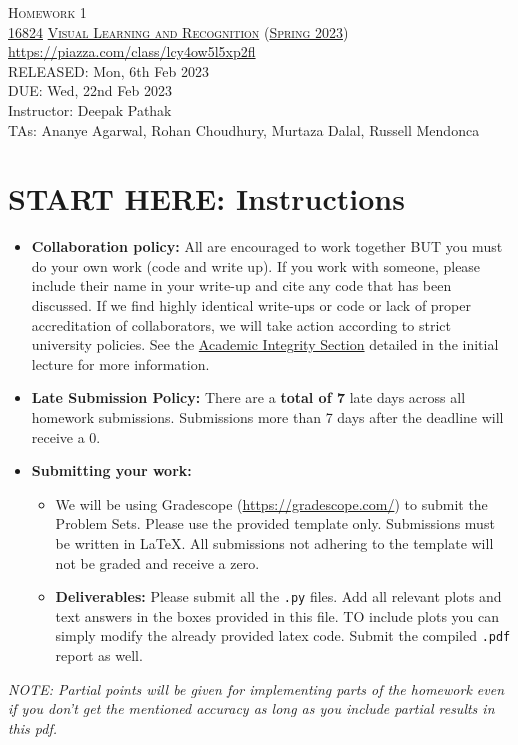 \documentclass[11pt,addpoints,answers]{exam}
\title{\textsc{\hwName}} %
\author{}
\date{}
\date{}
\numberwithin{equation}{section} %
\numberwithin{figure}{section} %
\numberwithin{table}{section} %
\newcommand{\courseNum}{\href{https://visual-learning.cs.cmu.edu/}{16824}}
\newcommand{\courseName}{\href{https://visual-learning.cs.cmu.edu/}{Visual Learning and Recognition}}
\newcommand{\courseSem}{\href{https://visual-learning.cs.cmu.edu/}{Spring 2023}}
\newcommand{\courseUrl}{\url{https://piazza.com/class/lcy4ow5l5xp2fl}}
\newcommand{\hwNum}{Homework 1}
\newcommand{\hwTopic}{Image Classification and Object Detection}
\newcommand{\outDate}{Mon, 6th Feb 2023}
\newcommand{\dueDate}{Wed, 22nd Feb 2023}
\newcommand{\instructorName}{Deepak Pathak}
\newcommand{\taNames}{Ananye Agarwal, Rohan Choudhury, Murtaza Dalal, Russell Mendonca}
\begin{document}
\section*{}
\begin{center}
  \textsc{\LARGE \hwNum} \\
  \vspace{1em}
  \textsc{\large \courseNum{} \courseName{} (\courseSem)} \\
  \courseUrl\\
  \vspace{1em}
  RELEASED: \outDate \\
  DUE: \dueDate \\
  Instructor: \instructorName \\
  TAs: \taNames
\end{center}

\section*{START HERE: Instructions}
\begin{itemize}
\item \textbf{Collaboration policy:} All are encouraged to work together BUT you must do your own work (code and write up). If you work with someone, please include their name in your write-up and cite any code that has been discussed. If we find highly identical write-ups or code or lack of proper accreditation of collaborators, we will take action according to strict university policies. See the \href{hhttps://www.cmu.edu/policies/student-and-student-life/academic-integrity.html}{Academic Integrity Section} detailed in the initial lecture for more information.

\item\textbf{Late Submission Policy:} There are a \textbf{total of 7} late days across all homework submissions. Submissions more than 7 days after the deadline will receive a 0.

\item\textbf{Submitting your work:}

\begin{itemize}

\item We will be using Gradescope (\url{https://gradescope.com/}) to submit the Problem Sets. Please use the provided template only. Submissions must be written in LaTeX. All submissions not adhering to the template will not be graded and receive a zero. 
\item \textbf{Deliverables:} Please submit all the \texttt{.py} files. Add all relevant plots and text answers in the boxes provided in this file. TO include plots you can simply modify the already provided latex code. Submit the compiled \texttt{.pdf} report as well.
\end{itemize}
\end{itemize}
\emph{NOTE: Partial points will be given for implementing parts of the homework even if you don't get the mentioned accuracy as long as you include partial results in this pdf.}
\clearpage
\end{document}
